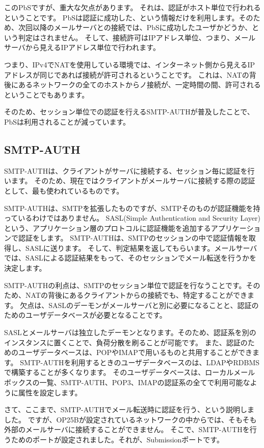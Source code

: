このPbSですが、重大な欠点があります。
それは、認証がホスト単位で行われるということです。
PbSは認証に成功した、という情報だけを利用します。そのため、次回以降のメールサーバとの接続では、PbSに成功したユーザかどうか、という判定はされません。
そして、接続許可はIPアドレス単位、つまり、メールサーバから見えるIPアドレス単位で行われます。

つまり、IPv4でNATを使用している環境では、インターネット側から見えるIPアドレスが同じであれば接続が許可されるということです。
これは、NATの背後にあるネットワークの全てのホストからノ接続が、一定時間の間、許可されるということでもあります。

そのため、セッション単位での認証を行えるSMTP-AUTHが普及したことで、PbSは利用されることが減っています。

\subsection{SMTP-AUTH}

SMTP-AUTHは、クライアントがサーバに接続する、セッション毎に認証を行います。
そのため、現在ではクライアントがメールサーバに接続する際の認証として、最も使われているものです。

SMTP-AUTHは、SMTPを拡張したものですが、SMTPそのものが認証機能を持っているわけではありません。
SASL(Simple Authentication and Security Layer)という、アプリケーション層のプロトコルに認証機能を追加するアプリケーションで認証をします。
SMTP-AUTHは、SMTPのセッションの中で認証情報を取得し、SASLに送ります。
そして、判定結果を返してもらいます。メールサーバでは、SASLによる認証結果をもって、そのセッションでメール転送を行うかを決定します。

SMTP-AUTHの利点は、SMTPのセッション単位で認証を行なうことです。そのため、NATの背後にあるクライアントからの接続でも、特定することができます。
欠点は、SASLのデーモンがメールサーバと別に必要になることと、認証のためのユーザデータベースが必要となることです。

SASLとメールサーバは独立したデーモンとなります。そのため、認証系を別のインスタンスに置くことで、負荷分散を刷ることが可能です。
また、認証のためのユーザデータベースは、POPやIMAPで用いるものと共用することができます。
SMTP-AUTHを利用するときのユーザデータベースのは、LDAPやRDBMSで構築することが多くなります。
そのユーザデータベースは、ローカルメールボックスの一覧、SMTP-AUTH、POP3、IMAPの認証系の全てで利用可能なように属性を設定します。

さて、ここまで、SMTP-AUTHでメール転送時に認証を行う、という説明しました。
ですが、OP25Bが設定されているネットワークの中からでは、そもそも外部のメールサーバに接続することができません。
そこで、SMTP-AUTHを行うためのポートが設定されました。それが、Submissionポートです。


